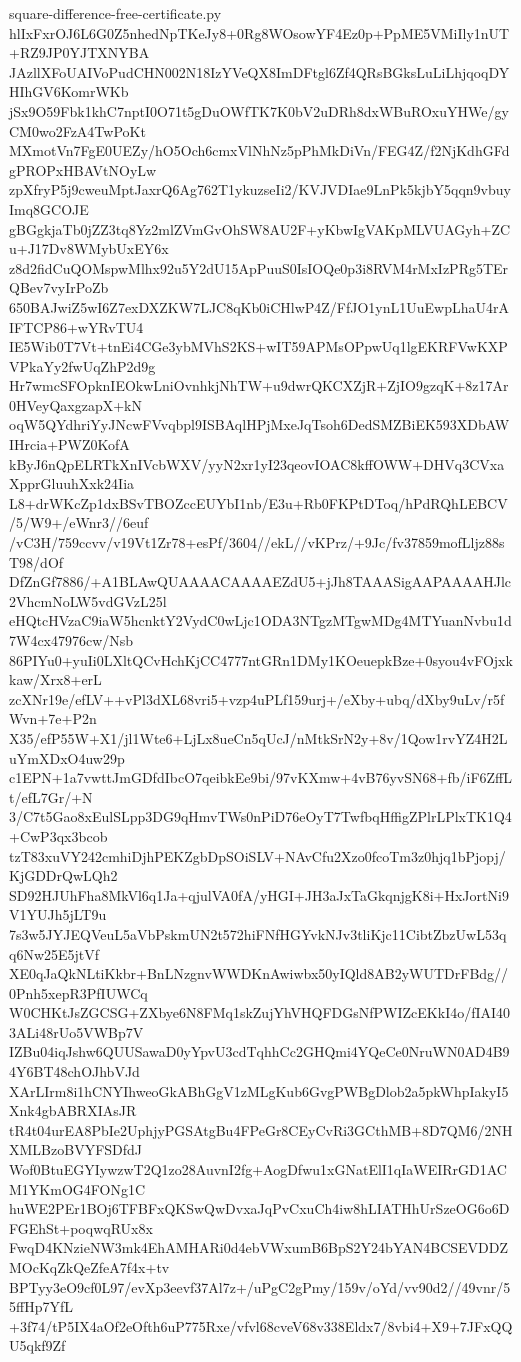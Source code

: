 \documentclass[11pt]{article}
\theoremstyle{definition}
\theoremstyle{remark}
\begin{document}
\begin{filecontents*}[overwrite]{square-difference-free-certificate.py}
hlIxFxrOJ6L6G0Z5nhedNpTKeJy8+0Rg8WOsowYF4Ez0p+PpME5VMiIly1nUT+RZ9JP0YJTXNYBA
JAzllXFoUAIVoPudCHN002N18IzYVeQX8ImDFtgl6Zf4QRsBGksLuLiLhjqoqDYHIhGV6KomrWKb
jSx9O59Fbk1khC7nptI0O71t5gDuOWfTK7K0bV2uDRh8dxWBuROxuYHWe/gyCM0wo2FzA4TwPoKt
MXmotVn7FgE0UEZy/hO5Och6cmxVlNhNz5pPhMkDiVn/FEG4Z/f2NjKdhGFdgPROPxHBAVtNOyLw
zpXfryP5j9cweuMptJaxrQ6Ag762T1ykuzseIi2/KVJVDIae9LnPk5kjbY5qqn9vbuyImq8GCOJE
gBGgkjaTb0jZZ3tq8Yz2mlZVmGvOhSW8AU2F+yKbwIgVAKpMLVUAGyh+ZCu+J17Dv8WMybUxEY6x
z8d2fidCuQOMspwMlhx92u5Y2dU15ApPuuS0IsIOQe0p3i8RVM4rMxIzPRg5TErQBev7vyIrPoZb
650BAJwiZ5wI6Z7exDXZKW7LJC8qKb0iCHlwP4Z/FfJO1ynL1UuEwpLhaU4rAIFTCP86+wYRvTU4
IE5Wib0T7Vt+tnEi4CGe3ybMVhS2KS+wIT59APMsOPpwUq1lgEKRFVwKXPVPkaYy2fwUqZhP2d9g
Hr7wmcSFOpknIEOkwLniOvnhkjNhTW+u9dwrQKCXZjR+ZjIO9gzqK+8z17Ar0HVeyQaxgzapX+kN
oqW5QYdhriYyJNcwFVvqbpl9ISBAqlHPjMxeJqTsoh6DedSMZBiEK593XDbAWIHrcia+PWZ0KofA
kByJ6nQpELRTkXnIVcbWXV/yyN2xr1yI23qeovIOAC8kffOWW+DHVq3CVxaXpprGluuhXxk24Iia
L8+drWKcZp1dxBSvTBOZccEUYbI1nb/E3u+Rb0FKPtDToq/hPdRQhLEBCV/5/W9+/eWnr3//6euf
/vC3H/759ccvv/v19Vt1Zr78+esPf/3604//ekL//vKPrz/+9Jc/fv37859mofLljz88sT98/dOf
DfZnGf7886/+A1BLAwQUAAAACAAAAEZdU5+jJh8TAAASigAAPAAAAHJlc2VhcmNoLW5vdGVzL25l
eHQtcHVzaC9iaW5hcnktY2VydC0wLjc1ODA3NTgzMTgwMDg4MTYuanNvbu1d7W4cx47976cw/Nsb
86PIYu0+yuIi0LXltQCvHchKjCC4777ntGRn1DMy1KOeuepkBze+0syou4vFOjxkkaw/Xrx8+erL
zcXNr19e/efLV++vPl3dXL68vri5+vzp4uPLf159urj+/eXby+ubq/dXby9uLv/r5fWvn+7e+P2n
X35/efP55W+X1/jl1Wte6+LjLx8ueCn5qUcJ/nMtkSrN2y+8v/1Qow1rvYZ4H2LuYmXDxO4uw29p
c1EPN+1a7vwttJmGDfdIbcO7qeibkEe9bi/97vKXmw+4vB76yvSN68+fb/iF6ZffLt/efL7Gr/+N
3/C7t5Gao8xEulSLpp3DG9qHmvTWs0nPiD76eOyT7TwfbqHffigZPlrLPlxTK1Q4+CwP3qx3bcob
tzT83xuVY242cmhiDjhPEKZgbDpSOiSLV+NAvCfu2Xzo0fcoTm3z0hjq1bPjopj/KjGDDrQwLQh2
SD92HJUhFha8MkVl6q1Ja+qjulVA0fA/yHGI+JH3aJxTaGkqnjgK8i+HxJortNi9V1YUJh5jLT9u
7s3w5JYJEQVeuL5aVbPskmUN2t572hiFNfHGYvkNJv3tliKjc11CibtZbzUwL53qq6Nw25E5jtVf
XE0qJaQkNLtiKkbr+BnLNzgnvWWDKnAwiwbx50yIQld8AB2yWUTDrFBdg//0Pnh5xepR3PfIUWCq
W0CHKtJsZGCSG+ZXbye6N8FMq1skZujYhVHQFDGsNfPWIZcEKkI4o/fIAI403ALi48rUo5VWBp7V
IZBu04iqJshw6QUUSawaD0yYpvU3cdTqhhCc2GHQmi4YQeCe0NruWN0AD4B94Y6BT48chOJhbVJd
XArLIrm8i1hCNYIhweoGkABhGgV1zMLgKub6GvgPWBgDlob2a5pkWhpIakyI5Xnk4gbABRXIAsJR
tR4t04urEA8PbIe2UphjyPGSAtgBu4FPeGr8CEyCvRi3GCthMB+8D7QM6/2NHXMLBzoBVYFSDfdJ
Wof0BtuEGYIywzwT2Q1zo28AuvnI2fg+AogDfwu1xGNatElI1qIaWEIRrGD1ACM1YKmOG4FONg1C
huWE2PEr1BOj6TFBFxQKSwQwDvxaJqPvCxuCh4iw8hLIATHhUrSzeOG6o6DFGEhSt+poqwqRUx8x
FwqD4KNzieNW3mk4EhAMHARi0d4ebVWxumB6BpS2Y24bYAN4BCSEVDDZMOcKqZkQeZfeA7f4x+tv
BPTyy3eO9cf0L97/evXp3eevf37Al7z+/uPgC2gPmy/159v/oYd/vv90d2//49vnr/55ffHp7YfL
+3f74/tP5IX4aOf2eOfth6uP775Rxe/vfvl68cveV68v338Eldx7/8vbi4+X9+7JFxQQU5qkf9Zf

\end{filecontents*}
\end{document}
